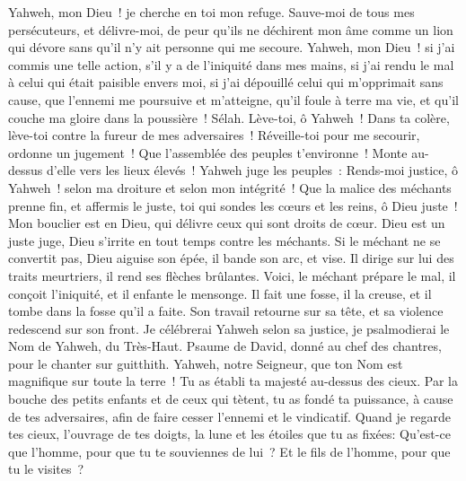 \begin{multicols}{2}
Yahweh, mon Dieu~! je cherche en toi mon refuge. Sauve-moi de tous mes persécuteurs, et délivre-moi,
de peur qu'ils ne déchirent mon âme comme un lion qui dévore sans qu'il n'y ait personne qui me secoure.
Yahweh, mon Dieu~! si j'ai commis une telle action, s'il y a de l'iniquité dans mes mains,
si j'ai rendu le mal à celui qui était paisible envers moi, si j'ai dépouillé celui qui m'opprimait sans cause,
que l'ennemi me poursuive et m'atteigne, qu'il foule à terre ma vie, et qu'il couche ma gloire dans la poussière~! Sélah.
Lève-toi, ô Yahweh~! Dans ta colère, lève-toi contre la fureur de mes adversaires~! Réveille-toi pour me secourir, ordonne un jugement~!
Que l'assemblée des peuples t'environne~! Monte au-dessus d'elle vers les lieux élevés~!
Yahweh juge les peuples~: Rends-moi justice, ô Yahweh~! selon ma droiture et selon mon intégrité~!
Que la malice des méchants prenne fin, et affermis le juste, toi qui sondes les cœurs et les reins, ô Dieu juste~!
Mon bouclier est en Dieu, qui délivre ceux qui sont droits de cœur.
Dieu est un juste juge, Dieu s'irrite en tout temps contre les méchants.
Si le méchant ne se convertit pas, Dieu aiguise son épée, il bande son arc, et vise.
Il dirige sur lui des traits meurtriers, il rend ses flèches brûlantes.
Voici, le méchant prépare le mal, il conçoit l'iniquité, et il enfante le mensonge.
Il fait une fosse, il la creuse, et il tombe dans la fosse qu'il a faite.
Son travail retourne sur sa tête, et sa violence redescend sur son front.
Je célébrerai Yahweh selon sa justice, je psalmodierai le Nom de Yahweh, du Très-Haut.
\VerseOne{}Psaume de David, donné au chef des chantres, pour le chanter sur guitthith.
Yahweh, notre Seigneur, que ton Nom est magnifique sur toute la terre~! Tu as établi ta majesté au-dessus des cieux.
Par la bouche des petits enfants et de ceux qui tètent, tu as fondé ta puissance, à cause de tes adversaires, afin de faire cesser l'ennemi et le vindicatif.
Quand je regarde tes cieux, l'ouvrage de tes doigts, la lune et les étoiles que tu as fixées:
Qu'est-ce que l'homme, pour que tu te souviennes de lui~? Et le fils de l'homme, pour que tu le visites~?

\end{multicols}
